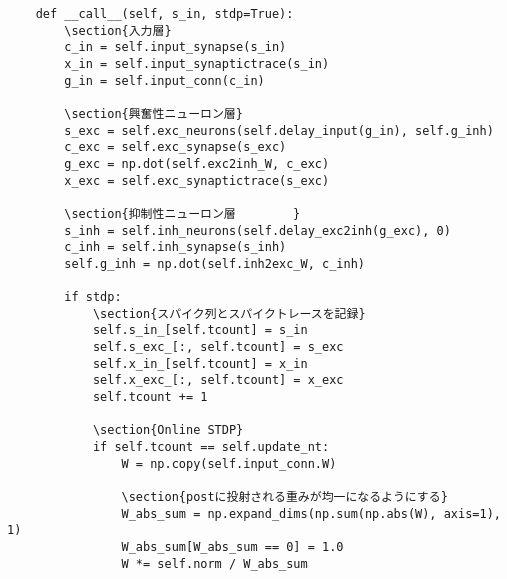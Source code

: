 \begin{verbatim}
    def __call__(self, s_in, stdp=True):
        \section{入力層}
        c_in = self.input_synapse(s_in)
        x_in = self.input_synaptictrace(s_in)
        g_in = self.input_conn(c_in)

        \section{興奮性ニューロン層}
        s_exc = self.exc_neurons(self.delay_input(g_in), self.g_inh)
        c_exc = self.exc_synapse(s_exc)
        g_exc = np.dot(self.exc2inh_W, c_exc)
        x_exc = self.exc_synaptictrace(s_exc)

        \section{抑制性ニューロン層        }
        s_inh = self.inh_neurons(self.delay_exc2inh(g_exc), 0)
        c_inh = self.inh_synapse(s_inh)
        self.g_inh = np.dot(self.inh2exc_W, c_inh)

        if stdp:
            \section{スパイク列とスパイクトレースを記録}
            self.s_in_[self.tcount] = s_in
            self.s_exc_[:, self.tcount] = s_exc
            self.x_in_[self.tcount] = x_in 
            self.x_exc_[:, self.tcount] = x_exc
            self.tcount += 1

            \section{Online STDP}
            if self.tcount == self.update_nt:
                W = np.copy(self.input_conn.W)
                
                \section{postに投射される重みが均一になるようにする}
                W_abs_sum = np.expand_dims(np.sum(np.abs(W), axis=1), 1)
                W_abs_sum[W_abs_sum == 0] = 1.0
                W *= self.norm / W_abs_sum
                

\end{verbatim}
